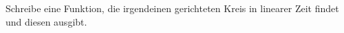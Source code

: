 \begin{aufg}
Schreibe eine Funktion, die irgendeinen gerichteten Kreis in linearer Zeit findet und diesen ausgibt. 
\end{aufg}